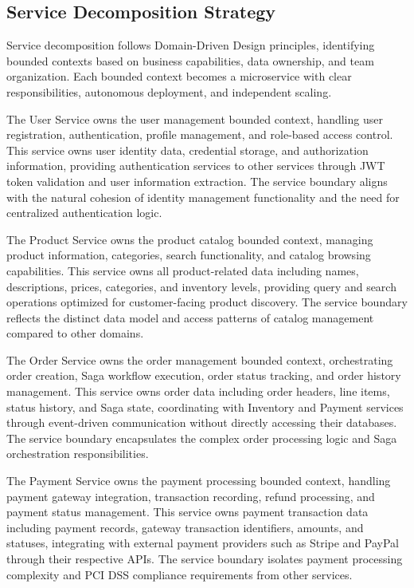 \subsection{Service Decomposition Strategy}

Service decomposition follows Domain-Driven Design principles, identifying bounded contexts based on business capabilities, data ownership, and team organization. Each bounded context becomes a microservice with clear responsibilities, autonomous deployment, and independent scaling.

The User Service owns the user management bounded context, handling user registration, authentication, profile management, and role-based access control. This service owns user identity data, credential storage, and authorization information, providing authentication services to other services through JWT token validation and user information extraction. The service boundary aligns with the natural cohesion of identity management functionality and the need for centralized authentication logic.

The Product Service owns the product catalog bounded context, managing product information, categories, search functionality, and catalog browsing capabilities. This service owns all product-related data including names, descriptions, prices, categories, and inventory levels, providing query and search operations optimized for customer-facing product discovery. The service boundary reflects the distinct data model and access patterns of catalog management compared to other domains.

The Order Service owns the order management bounded context, orchestrating order creation, Saga workflow execution, order status tracking, and order history management. This service owns order data including order headers, line items, status history, and Saga state, coordinating with Inventory and Payment services through event-driven communication without directly accessing their databases. The service boundary encapsulates the complex order processing logic and Saga orchestration responsibilities.

The Payment Service owns the payment processing bounded context, handling payment gateway integration, transaction recording, refund processing, and payment status management. This service owns payment transaction data including payment records, gateway transaction identifiers, amounts, and statuses, integrating with external payment providers such as Stripe and PayPal through their respective APIs. The service boundary isolates payment processing complexity and PCI DSS compliance requirements from other services.

